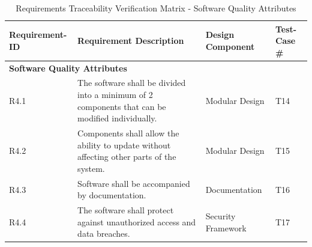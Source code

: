 \documentclass[letterpaper,12pt,oneside,listof=totoc]{scrreprt}
\begin{document}
\begin{table}[h]
\centering
\begin{tabularx}{\textwidth}{|l|X|X|l|}
\hline
\textbf{Requirement-ID} & \textbf{Requirement Description} & \textbf{Design Component} & \textbf{Test-Case \#} \\
\hline
\multicolumn{4}{|l|}{\textbf{Software Quality Attributes}} \\
\hline
R4.1 & The software shall be divided into a minimum of 2 components that can be modified individually. & Modular Design & T14 \\
\hline
R4.2 & Components shall allow the ability to update without affecting other parts of the system. & Modular Design & T15 \\
\hline
R4.3 & Software shall be accompanied by documentation. & Documentation & T16 \\
\hline
R4.4 & The software shall protect against unauthorized access and data breaches. & Security Framework & T17 \\
\hline
\end{tabularx}
\caption{Requirements Traceability Verification Matrix - Software Quality Attributes}
\label{tab:RTVM3}
\end{table}
\end{document}
